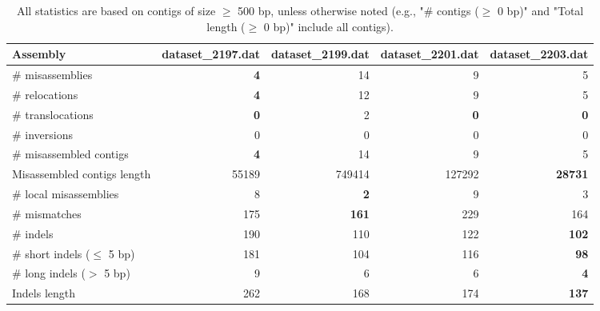\documentclass[12pt,a4paper]{article}
\begin{document}
\begin{table}[ht]
\begin{center}
\caption{All statistics are based on contigs of size $\geq$ 500 bp, unless otherwise noted (e.g., "\# contigs ($\geq$ 0 bp)" and "Total length ($\geq$ 0 bp)" include all contigs).}
\begin{tabular}{|l*{4}{|r}|}
\hline
Assembly & dataset\_2197.dat & dataset\_2199.dat & dataset\_2201.dat & dataset\_2203.dat \\ \hline
\# misassemblies & {\bf 4} & 14 & 9 & 5 \\ \hline
\hspace{5mm}\# relocations & {\bf 4} & 12 & 9 & 5 \\ \hline
\hspace{5mm}\# translocations & {\bf 0} & 2 & {\bf 0} & {\bf 0} \\ \hline
\hspace{5mm}\# inversions & 0 & 0 & 0 & 0 \\ \hline
\# misassembled contigs & {\bf 4} & 14 & 9 & 5 \\ \hline
Misassembled contigs length & 55189 & 749414 & 127292 & {\bf 28731} \\ \hline
\# local misassemblies & 8 & {\bf 2} & 9 & 3 \\ \hline
\# mismatches & 175 & {\bf 161} & 229 & 164 \\ \hline
\# indels & 190 & 110 & 122 & {\bf 102} \\ \hline
\hspace{5mm}\# short indels ($\leq$ 5 bp) & 181 & 104 & 116 & {\bf 98} \\ \hline
\hspace{5mm}\# long indels ($>$ 5 bp) & 9 & 6 & 6 & {\bf 4} \\ \hline
Indels length & 262 & 168 & 174 & {\bf 137} \\ \hline
\end{tabular}
\end{center}
\end{table}
\end{document}
